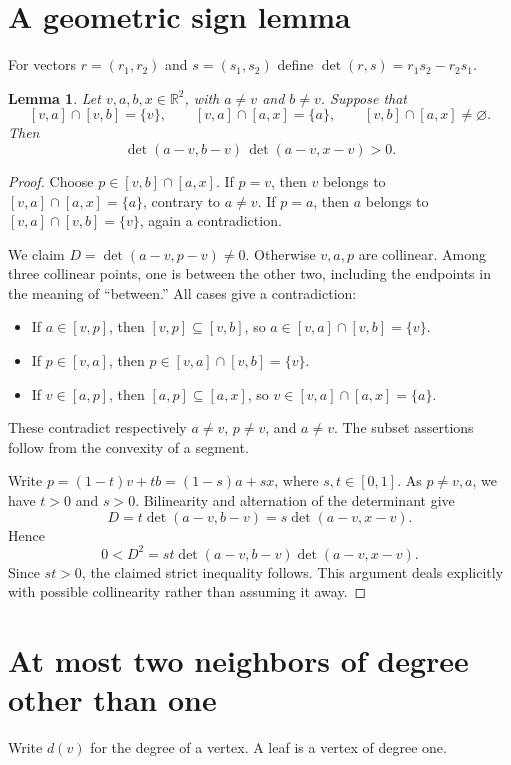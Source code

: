 \documentclass[11pt]{article}
\newtheorem{lemma}[theorem]{Lemma}
\newcommand{\seg}[2]{[#1,#2]}
\newcommand{\detp}[2]{\det\!\left(#1,#2\right)}
\begin{document}
\section{A geometric sign lemma}
For vectors $r=(r_1,r_2)$ and $s=(s_1,s_2)$ define
$\detp rs=r_1s_2-r_2s_1$.

\begin{lemma}\label{lem:sign}
Let $v,a,b,x\in\mathbb R^2$, with $a\ne v$ and $b\ne v$. Suppose that
\[
 \seg va\cap\seg vb=\{v\},\qquad
 \seg va\cap\seg ax=\{a\},\qquad
 \seg vb\cap\seg ax\ne\varnothing.
\]
Then
\[
 \detp{a-v}{b-v}\,\detp{a-v}{x-v}>0.
\]
\end{lemma}

\begin{proof}
Choose $p\in\seg vb\cap\seg ax$. If $p=v$, then $v$ belongs to
$\seg va\cap\seg ax=\{a\}$, contrary to $a\ne v$. If $p=a$, then $a$
belongs to $\seg va\cap\seg vb=\{v\}$, again a contradiction.

We claim $D=\detp{a-v}{p-v}\ne0$. Otherwise $v,a,p$ are collinear.
Among three collinear points, one is between the other two, including the
endpoints in the meaning of ``between.'' All cases give a contradiction:
\begin{itemize}
\item If $a\in\seg vp$, then $\seg vp\subseteq\seg vb$, so
      $a\in\seg va\cap\seg vb=\{v\}$.
\item If $p\in\seg va$, then $p\in\seg va\cap\seg vb=\{v\}$.
\item If $v\in\seg ap$, then $\seg ap\subseteq\seg ax$, so
      $v\in\seg va\cap\seg ax=\{a\}$.
\end{itemize}
These contradict respectively $a\ne v$, $p\ne v$, and $a\ne v$.
The subset assertions follow from the convexity of a segment.

Write $p=(1-t)v+tb=(1-s)a+sx$, where $s,t\in[0,1]$. As $p\ne v,a$,
we have $t>0$ and $s>0$. Bilinearity and alternation of the determinant give
\[
 D=t\detp{a-v}{b-v}=s\detp{a-v}{x-v}.
\]
Hence
\[
 0<D^2=st\detp{a-v}{b-v}\detp{a-v}{x-v}.
\]
Since $st>0$, the claimed strict inequality follows. This argument deals
explicitly with possible collinearity rather than assuming it away.
\end{proof}

\section{At most two neighbors of degree other than one}
Write $d(v)$ for the degree of a vertex. A leaf is a vertex of degree one.
\end{document}
